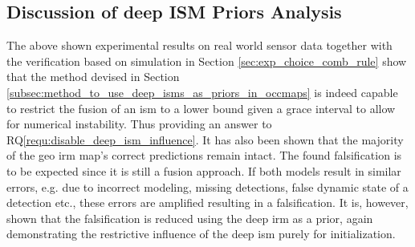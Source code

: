 \subsection{Discussion of deep ISM Priors Analysis}
\label{subsec:discussion_of_prior_analy}
The above shown experimental results on real world sensor data together with the verification based on simulation in Section \ref{sec:exp_choice_comb_rule} show that the method devised in Section \ref{subsec:method_to_use_deep_isms_as_priors_in_occmaps} is indeed capable to restrict the fusion of an \gls{ism} to a lower bound given a grace interval to allow for numerical instability. Thus providing an answer to RQ\ref{requ:disable_deep_ism_influence}. It has also been shown that the majority of the geo \gls{irm} map's correct predictions remain intact. The found falsification is to be expected since it is still a fusion approach. If both models result in similar errors, e.g. due to incorrect modeling, missing detections, false dynamic state of a detection etc., these errors are amplified resulting in a falsification. It is, however, shown that the falsification is reduced using the deep \gls{irm} as a prior, again demonstrating the restrictive influence of the deep \gls{ism} purely for initialization.